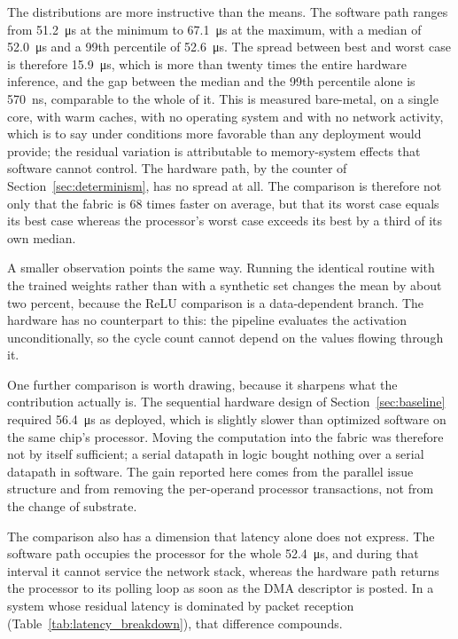 \documentclass[final,5p,times,twocolumn]{elsarticle}
\begin{document}
The distributions are more instructive than the means. The software path
ranges from \SI{51.2}{\micro\second} at the minimum to
\SI{67.1}{\micro\second} at the maximum, with a median of
\SI{52.0}{\micro\second} and a 99th percentile of \SI{52.6}{\micro\second}. The
spread between best and worst case is therefore \SI{15.9}{\micro\second}, which
is more than twenty times the entire hardware inference, and the gap between the
median and the 99th percentile alone is \SI{570}{\nano\second}, comparable to
the whole of it. This is measured bare-metal, on a single core, with warm
caches, with no operating system and with no network activity, which is to say
under conditions more favorable than any deployment would provide; the residual
variation is attributable to memory-system effects that software cannot control.
The hardware path, by the counter of Section~\ref{sec:determinism}, has no
spread at all. The comparison is therefore not only that the fabric is
\num{68} times faster on average, but that its worst case equals its best case
whereas the processor's worst case exceeds its best by a third of its own
median.

A smaller observation points the same way. Running the identical routine with
the trained weights rather than with a synthetic set changes the mean by about
two percent, because the ReLU comparison is a data-dependent branch. The
hardware has no counterpart to this: the pipeline evaluates the activation
unconditionally, so the cycle count cannot depend on the values flowing through
it.

One further comparison is worth drawing, because it sharpens what the
contribution actually is. The sequential hardware design of
Section~\ref{sec:baseline} required \SI{56.4}{\micro\second} as deployed, which
is slightly slower than optimized software on the same chip's processor. Moving
the computation into the fabric was therefore not by itself sufficient; a serial
datapath in logic bought nothing over a serial datapath in software. The gain
reported here comes from the parallel issue structure and from removing the
per-operand processor transactions, not from the change of substrate.

The comparison also has a dimension that latency alone does not express. The
software path occupies the processor for the whole \SI{52.4}{\micro\second}, and
during that interval it cannot service the network stack, whereas the hardware
path returns the processor to its polling loop as soon as the DMA descriptor is
posted. In a system whose residual latency is dominated by packet reception
(Table~\ref{tab:latency_breakdown}), that difference compounds.
\end{document}
